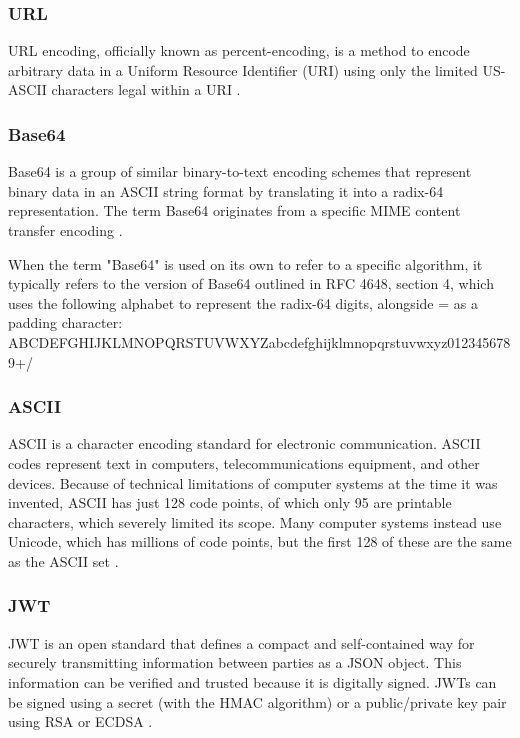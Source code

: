 \subsubsection{URL}

URL encoding, officially known as percent-encoding, is a method to encode arbitrary data in a Uniform Resource Identifier (URI) using only the limited US-ASCII characters legal within a URI \autocite{Wikipedia2023}.

\subsubsection{Base64}

Base64 is a group of similar binary-to-text encoding schemes that represent binary data in an ASCII string format by translating it into a radix-64 representation. The term Base64 originates from a specific MIME content transfer encoding \autocite{Mozilla2023}.

When the term "Base64" is used on its own to refer to a specific algorithm, it typically refers to the version of Base64 outlined in RFC 4648, section 4, which uses the following alphabet to represent the radix-64 digits, alongside = as a padding character: ABCDEFGHIJKLMNOPQRSTUVWXYZabcdefghijklmnopqrstuvwxyz0123456789+/

\subsubsection{ASCII}

ASCII is a character encoding standard for electronic communication. ASCII codes represent text in computers, telecommunications equipment, and other devices. Because of technical limitations of computer systems at the time it was invented, ASCII has just 128 code points, of which only 95 are printable characters, which severely limited its scope. Many computer systems instead use Unicode, which has millions of code points, but the first 128 of these are the same as the ASCII set \autocite{Wikipedia2023a}.

\subsubsection{JWT}

JWT is an open standard that defines a compact and self-contained way for securely transmitting information between parties as a JSON object. This information can be verified and trusted because it is digitally signed. JWTs can be signed using a secret (with the HMAC algorithm) or a public/private key pair using RSA or ECDSA \autocite{JWT}.

